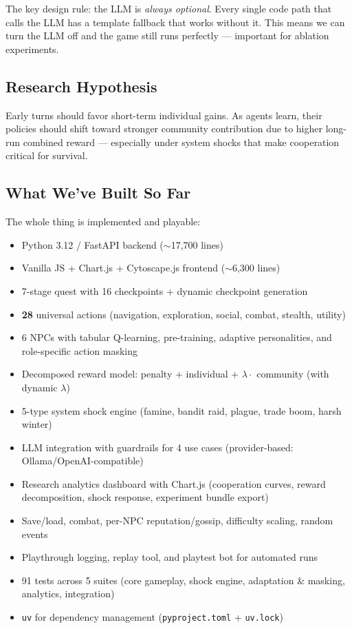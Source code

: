 The key design rule: the LLM is \emph{always optional}. Every single code path that calls the LLM has a template fallback that works without it. This means we can turn the LLM off and the game still runs perfectly --- important for ablation experiments.

\subsection{Research Hypothesis}

Early turns should favor short-term individual gains. As agents learn, their policies should shift toward stronger community contribution due to higher long-run combined reward --- especially under system shocks that make cooperation critical for survival.

\subsection{What We've Built So Far}

The whole thing is implemented and playable:
\begin{itemize}
    \item Python 3.12 / FastAPI backend (${\sim}$17,700 lines)
    \item Vanilla JS + Chart.js + Cytoscape.js frontend (${\sim}$6,300 lines)
    \item 7-stage quest with 16 checkpoints + dynamic checkpoint generation
    \item \textbf{28} universal actions (navigation, exploration, social, combat, stealth, utility)
    \item 6 NPCs with tabular Q-learning, pre-training, adaptive personalities, and role-specific action masking
    \item Decomposed reward model: penalty + individual + $\lambda \cdot$ community (with dynamic $\lambda$)
    \item 5-type system shock engine (famine, bandit raid, plague, trade boom, harsh winter)
    \item LLM integration with guardrails for 4 use cases (provider-based: Ollama/OpenAI-compatible)
    \item Research analytics dashboard with Chart.js (cooperation curves, reward decomposition, shock response, experiment bundle export)
    \item Save/load, combat, per-NPC reputation/gossip, difficulty scaling, random events
    \item Playthrough logging, replay tool, and playtest bot for automated runs
    \item 91 tests across 5 suites (core gameplay, shock engine, adaptation \& masking, analytics, integration)
    \item \texttt{uv} for dependency management (\texttt{pyproject.toml} + \texttt{uv.lock})
\end{itemize}

